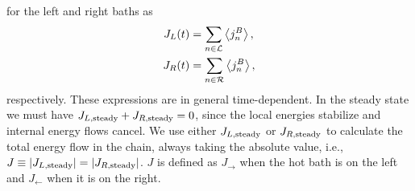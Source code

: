 for the left and right baths as
%
\begin{equation}
    \begin{split}
        J_L (t)&= \sum_{n\in {\cal L}} \expval{j^B_n},\\
        J_R (t)&= \sum_{n\in {\cal R}} \expval{j^B_n},
    \end{split}
    \label{eq:BathHeatFlows}
\end{equation}
%
respectively. These expressions are in general time-dependent.
In the steady state we must have $J_{L,{\rm steady}} + J_{R,{\rm steady}} = 0$, since the local energies stabilize and internal energy
flows cancel. We use either $J_{L,{\rm steady}}$ or $J_{R,{\rm steady}}$ to calculate the total energy flow in the chain, always taking the absolute value, i.e., $J \equiv \abs{J_{L,{\rm steady}}}= \abs{J_{R,{\rm steady}}}$. $J$ is defined as $J_\rightarrow$ when the hot bath is on the left
and $J_\leftarrow$ when it is on the right.

